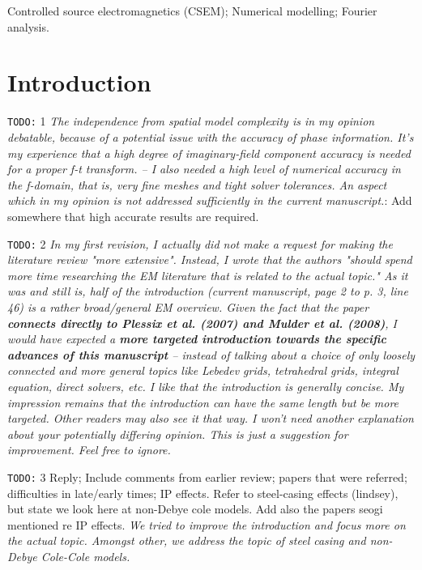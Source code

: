 \documentclass[extra, camera,%
    onecolumn,   %
    referee,     %
]{gji}
\newcommand{\rtodo}{{\color{red}\texttt{TODO:}}\xspace}
\begin{document}
\begin{keywords}
  Controlled source electromagnetics (CSEM); Numerical modelling; Fourier
  analysis.
\end{keywords}

\section{Introduction}  %


\rtodo 1 \emph{The independence from spatial model complexity is in my
  opinion debatable, because of a potential issue with the accuracy of phase
  information. It’s my experience that a high degree of imaginary-field
  component accuracy is needed for a proper f-t transform. --
  I also needed a high level of numerical accuracy in the f-domain, that is,
  very fine meshes and tight solver tolerances. An aspect which in my opinion
  is not addressed sufficiently in the current manuscript.}: Add somewhere that
  high accurate results are required.

\rtodo 2 \emph{In my first revision, I actually did not make a request
  for making the literature review "more extensive". Instead, I wrote that the
  authors "should spend more time researching the EM literature that is related
  to the actual topic." As it was and still is, half of the introduction
  (current manuscript, page 2 to p. 3, line 46) is a rather broad/general EM
  overview. Given the fact that the paper \textbf{connects directly to Plessix
  et al. (2007) and Mulder et al. (2008)}, I would have expected a \textbf{more
  targeted introduction towards the specific advances of this manuscript} –
  instead of talking about a choice of only loosely connected and more general
  topics like Lebedev grids, tetrahedral grids, integral equation, direct
  solvers, etc. I like that the introduction is generally concise. My
  impression remains that the introduction can have the same length but be more
  targeted. Other readers may also see it that way. I won’t need another
  explanation about your potentially differing opinion. This is just a
  suggestion for improvement. Feel free to ignore.}


\rtodo 3 Reply; Include comments from earlier review; papers that were
referred; difficulties in late/early times; IP effects. Refer to steel-casing
effects (lindsey), but state we look here at non-Debye cole models.
Add also the papers seogi mentioned re IP effects. \cite{CAG.19.Heagy}
\cite{EXP.20.Kang} \emph{We tried to improve the introduction and focus more on
  the actual topic. Amongst other, we address the topic of steel casing and
  non-Debye Cole-Cole models.}
\end{document}
